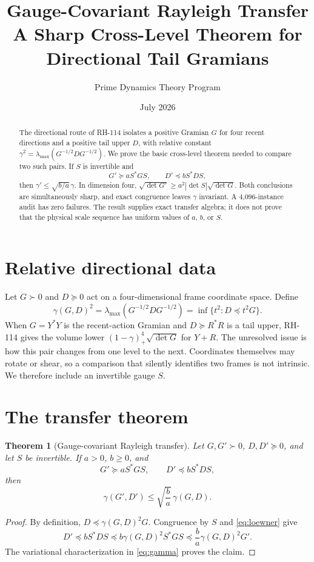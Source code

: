 \documentclass[12pt]{article}
\title{Gauge-Covariant Rayleigh Transfer\\\large A Sharp Cross-Level Theorem for Directional Tail Gramians}
\author{Prime Dynamics Theory Program}
\date{July 2026}
\newtheorem{theorem}{Theorem}
\begin{document}
\maketitle

\begin{abstract}
The directional route of RH-114 isolates a positive Gramian $G$ for four
recent directions and a positive tail upper $D$, with relative constant
$\gamma^2=\lambda_{\max}(G^{-1/2}DG^{-1/2})$.  We prove the basic
cross-level theorem needed to compare two such pairs.  If $S$ is invertible
and
\[
 G'\succeq aS^*GS,\qquad D'\preceq bS^*DS,
\]
then $\gamma'\leq\sqrt{b/a}\,\gamma$.  In dimension four,
$\sqrt{\det G'}\geq a^2|\det S|\sqrt{\det G}$.  Both conclusions are
simultaneously sharp, and exact congruence leaves $\gamma$ invariant.  A
4,096-instance audit has zero failures.  The result supplies exact transfer
algebra; it does not prove that the physical scale sequence has uniform
values of $a$, $b$, or $S$.
\end{abstract}

\section{Relative directional data}
Let $G\succ0$ and $D\succeq0$ act on a four-dimensional frame coordinate
space.  Define
\begin{equation}\label{eq:gamma}
 \gamma(G,D)^2=\lambda_{\max}(G^{-1/2}DG^{-1/2})
 =\inf\{t^2:D\preceq t^2G\}.
\end{equation}
When $G=Y^*Y$ is the recent-action Gramian and $D\succeq R^*R$ is a tail
upper, RH-114 gives the volume lower
$(1-\gamma)_+^4\sqrt{\det G}$ for $Y+R$.  The unresolved issue is how this
pair changes from one level to the next.  Coordinates themselves may rotate
or shear, so a comparison that silently identifies two frames is not
intrinsic.  We therefore include an invertible gauge $S$.

\section{The transfer theorem}
\begin{theorem}[Gauge-covariant Rayleigh transfer]\label{thm:transfer}
Let $G,G'\succ0$, $D,D'\succeq0$, and let $S$ be invertible.  If $a>0$,
$b\geq0$, and
\begin{equation}\label{eq:loewner}
 G'\succeq aS^*GS,\qquad D'\preceq bS^*DS,
\end{equation}
then
\begin{equation}\label{eq:gammatransfer}
 \gamma(G',D')\leq\sqrt{\frac ba}\,\gamma(G,D).
\end{equation}
\end{theorem}
\begin{proof}
By definition, $D\preceq\gamma(G,D)^2G$.  Congruence by $S$ and
\eqref{eq:loewner} give
\[
 D'\preceq bS^*DS
 \preceq b\gamma(G,D)^2S^*GS
 \preceq\frac ba\gamma(G,D)^2G'.
\]
The variational characterization in \eqref{eq:gamma} proves the claim.
\end{proof}
\end{document}
